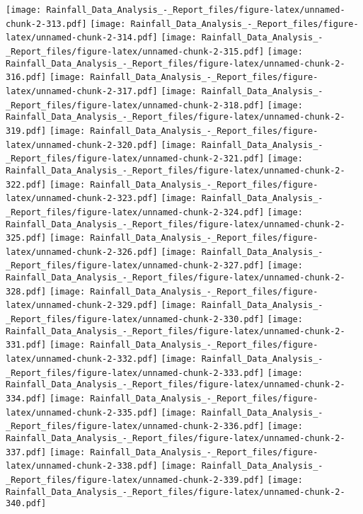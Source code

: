 \documentclass[
]{article}
\begin{document}
\texttt{[image: Rainfall\_Data\_Analysis\_-\_Report\_files/figure-latex/unnamed-chunk-2-313.pdf]}
\texttt{[image: Rainfall\_Data\_Analysis\_-\_Report\_files/figure-latex/unnamed-chunk-2-314.pdf]}
\texttt{[image: Rainfall\_Data\_Analysis\_-\_Report\_files/figure-latex/unnamed-chunk-2-315.pdf]}
\texttt{[image: Rainfall\_Data\_Analysis\_-\_Report\_files/figure-latex/unnamed-chunk-2-316.pdf]}
\texttt{[image: Rainfall\_Data\_Analysis\_-\_Report\_files/figure-latex/unnamed-chunk-2-317.pdf]}
\texttt{[image: Rainfall\_Data\_Analysis\_-\_Report\_files/figure-latex/unnamed-chunk-2-318.pdf]}
\texttt{[image: Rainfall\_Data\_Analysis\_-\_Report\_files/figure-latex/unnamed-chunk-2-319.pdf]}
\texttt{[image: Rainfall\_Data\_Analysis\_-\_Report\_files/figure-latex/unnamed-chunk-2-320.pdf]}
\texttt{[image: Rainfall\_Data\_Analysis\_-\_Report\_files/figure-latex/unnamed-chunk-2-321.pdf]}
\texttt{[image: Rainfall\_Data\_Analysis\_-\_Report\_files/figure-latex/unnamed-chunk-2-322.pdf]}
\texttt{[image: Rainfall\_Data\_Analysis\_-\_Report\_files/figure-latex/unnamed-chunk-2-323.pdf]}
\texttt{[image: Rainfall\_Data\_Analysis\_-\_Report\_files/figure-latex/unnamed-chunk-2-324.pdf]}
\texttt{[image: Rainfall\_Data\_Analysis\_-\_Report\_files/figure-latex/unnamed-chunk-2-325.pdf]}
\texttt{[image: Rainfall\_Data\_Analysis\_-\_Report\_files/figure-latex/unnamed-chunk-2-326.pdf]}
\texttt{[image: Rainfall\_Data\_Analysis\_-\_Report\_files/figure-latex/unnamed-chunk-2-327.pdf]}
\texttt{[image: Rainfall\_Data\_Analysis\_-\_Report\_files/figure-latex/unnamed-chunk-2-328.pdf]}
\texttt{[image: Rainfall\_Data\_Analysis\_-\_Report\_files/figure-latex/unnamed-chunk-2-329.pdf]}
\texttt{[image: Rainfall\_Data\_Analysis\_-\_Report\_files/figure-latex/unnamed-chunk-2-330.pdf]}
\texttt{[image: Rainfall\_Data\_Analysis\_-\_Report\_files/figure-latex/unnamed-chunk-2-331.pdf]}
\texttt{[image: Rainfall\_Data\_Analysis\_-\_Report\_files/figure-latex/unnamed-chunk-2-332.pdf]}
\texttt{[image: Rainfall\_Data\_Analysis\_-\_Report\_files/figure-latex/unnamed-chunk-2-333.pdf]}
\texttt{[image: Rainfall\_Data\_Analysis\_-\_Report\_files/figure-latex/unnamed-chunk-2-334.pdf]}
\texttt{[image: Rainfall\_Data\_Analysis\_-\_Report\_files/figure-latex/unnamed-chunk-2-335.pdf]}
\texttt{[image: Rainfall\_Data\_Analysis\_-\_Report\_files/figure-latex/unnamed-chunk-2-336.pdf]}
\texttt{[image: Rainfall\_Data\_Analysis\_-\_Report\_files/figure-latex/unnamed-chunk-2-337.pdf]}
\texttt{[image: Rainfall\_Data\_Analysis\_-\_Report\_files/figure-latex/unnamed-chunk-2-338.pdf]}
\texttt{[image: Rainfall\_Data\_Analysis\_-\_Report\_files/figure-latex/unnamed-chunk-2-339.pdf]}
\texttt{[image: Rainfall\_Data\_Analysis\_-\_Report\_files/figure-latex/unnamed-chunk-2-340.pdf]}
\end{document}
